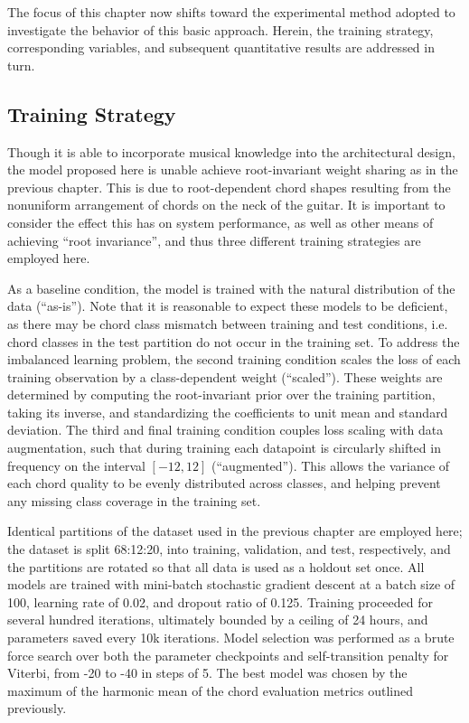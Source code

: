 The focus of this chapter now shifts toward the experimental method adopted to investigate the behavior of this basic approach.
Herein, the training strategy, corresponding variables, and subsequent quantitative results are addressed in turn.

\subsection{Training Strategy}
\label{subsec:strategy}

Though it is able to incorporate musical knowledge into the architectural design, the model proposed here is unable achieve root-invariant weight sharing as in the previous chapter.
This is due to root-dependent chord shapes resulting from the nonuniform arrangement of chords on the neck of the guitar.
It is important to consider the effect this has on system performance, as well as other means of achieving ``root invariance'', and thus three different training strategies are employed here.

As a baseline condition, the model is trained with the natural distribution of the data (``as-is'').
Note that it is reasonable to expect these models to be deficient, as there may be chord class mismatch between training and test conditions, i.e. chord classes in the test partition do not occur in the training set.
To address the imbalanced learning problem, the second training condition scales the loss of each training observation by a class-dependent weight (``scaled'').
These weights are determined by computing the root-invariant prior over the training partition, taking its inverse, and standardizing the coefficients to unit mean and standard deviation.
The third and final training condition couples loss scaling with data augmentation, such that during training each datapoint is circularly shifted in frequency on the interval $[-12, 12]$ (``augmented'').
This allows the variance of each chord quality to be evenly distributed across classes, and helping prevent any missing class coverage in the training set.

Identical partitions of the dataset used in the previous chapter are employed here; the dataset is split 68:12:20, into training, validation, and test, respectively, and the partitions are rotated so that all data is used as a holdout set once.
All models are trained with mini-batch stochastic gradient descent at a batch size of 100, learning rate of 0.02, and dropout ratio of 0.125.
Training proceeded for several hundred iterations, ultimately bounded by a ceiling of 24 hours, and parameters saved every 10k iterations.
Model selection was performed as a brute force search over both the parameter checkpoints and self-transition penalty for Viterbi, from -20 to -40 in steps of 5.
The best model was chosen by the maximum of the harmonic mean of the chord evaluation metrics outlined previously.


